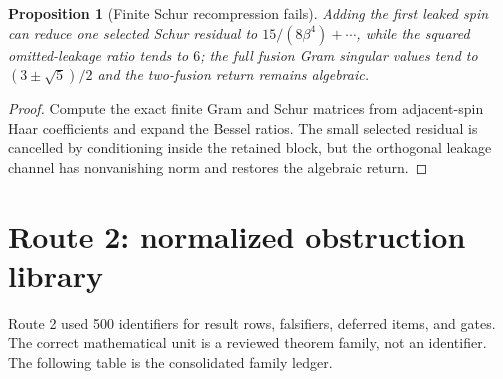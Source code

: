 \documentclass[11pt,oneside]{report}
\newtheorem{proposition}[theorem]{Proposition}
\theoremstyle{definition}
\theoremstyle{remark}
\begin{document}
\begin{proposition}[Finite Schur recompression fails]
Adding the first leaked spin can reduce one selected Schur residual to
$15/(8\beta^4)+\cdots$, while the squared omitted-leakage ratio tends to $6$;
the full fusion Gram singular values tend to $(3\pm\sqrt5)/2$ and the
two-fusion return remains algebraic.
\end{proposition}
\begin{proof}
Compute the exact finite Gram and Schur matrices from adjacent-spin Haar
coefficients and expand the Bessel ratios. The small selected residual is
cancelled by conditioning inside the retained block, but the orthogonal
leakage channel has nonvanishing norm and restores the algebraic return.
\end{proof}

\chapter{Route 2: normalized obstruction library}

Route 2 used 500 identifiers for result rows, falsifiers, deferred items, and
gates. The correct mathematical unit is a reviewed theorem family, not an
identifier. The following table is the consolidated family ledger.
\end{document}
